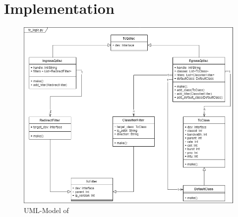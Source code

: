 \chapter{Implementation} \label{Implementation}
\begin{figure}[h]
	\centering
  	\includegraphics[width=\textwidth]{img/tc_logic_uml.png}
    \caption{UML-Model of }
    \label{tc_logic_uml}
\end{figure}